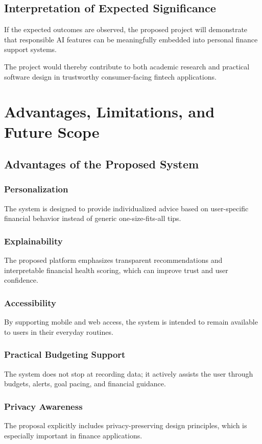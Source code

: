 \documentclass[12pt,a4paper]{report}
\begin{document}
\section{Interpretation of Expected Significance}
If the expected outcomes are observed,
the proposed project will demonstrate that responsible AI features can be meaningfully embedded into personal finance support systems.

The project would thereby contribute to both academic research and practical software design in trustworthy consumer-facing fintech applications.

\chapter{Advantages, Limitations, and Future Scope}

\section{Advantages of the Proposed System}
\subsection{Personalization}
The system is designed to provide individualized advice based on user-specific financial behavior instead of generic one-size-fits-all tips.

\subsection{Explainability}
The proposed platform emphasizes transparent recommendations and interpretable financial health scoring,
which can improve trust and user confidence.

\subsection{Accessibility}
By supporting mobile and web access,
the system is intended to remain available to users in their everyday routines.

\subsection{Practical Budgeting Support}
The system does not stop at recording data;
it actively assists the user through budgets,
alerts,
goal pacing,
and financial guidance.

\subsection{Privacy Awareness}
The proposal explicitly includes privacy-preserving design principles,
which is especially important in finance applications.
\end{document}
